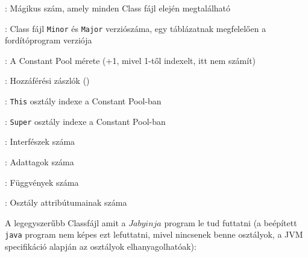 \begin{compactitem}
\setlength\itemsep{-5px}
\item {}: Mágikus szám, amely minden Class fájl elején megtalálható
\item {} : Class fájl \lstinline{Minor} és \lstinline{Major} verziószáma, egy táblázatnak megfelelően a fordítóprogram verziója
\item {}: A Constant Pool mérete (+1, mivel 1-től indexelt, itt nem számít)
\item {}: Hozzáférési zászlók ()
\item {}: \lstinline{This} osztály indexe a Constant Pool-ban
\item {}: \lstinline{Super} osztály indexe a Constant Pool-ban
\item {}: Interfészek száma
\item {}: Adattagok száma
\item {}: Függvények száma
\item {}: Osztály attribútumainak száma
\end{compactitem}

\pagebreak

A legegyszerűbb Classfájl amit a $Jabyinja$ program le tud futtatni (a beépített \lstinline{java} program nem képes ezt lefuttatni, mivel nincsenek benne osztályok, a JVM specifikáció alapján az osztályok elhanyagolhatóak):

